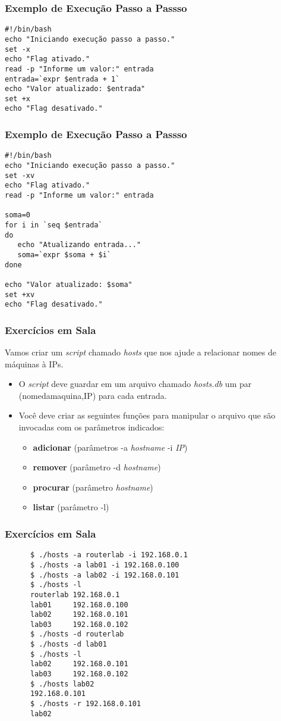 \documentclass{beamer}
\begin{document}
   \begin{frame}[fragile]
      \frametitle{Exemplo de Execução Passo a Passso}
      \begin{verbatim}
#!/bin/bash
echo "Iniciando execução passo a passo."
set -x
echo "Flag ativado."
read -p "Informe um valor:" entrada
entrada=`expr $entrada + 1`
echo "Valor atualizado: $entrada"
set +x
echo "Flag desativado."
      \end{verbatim}
\end{frame}

   \begin{frame}[fragile]
      \frametitle{Exemplo de Execução Passo a Passso}
      \begin{verbatim}
#!/bin/bash
echo "Iniciando execução passo a passo."
set -xv
echo "Flag ativado."
read -p "Informe um valor:" entrada

soma=0
for i in `seq $entrada`
do
   echo "Atualizando entrada..."
   soma=`expr $soma + $i`
done

echo "Valor atualizado: $soma"
set +xv
echo "Flag desativado."
      \end{verbatim}
\end{frame}


   \begin{frame}
      \frametitle{Exercícios em Sala}
      Vamos criar um \textit{script} chamado \textit{hosts} que nos ajude a relacionar nomes de máquinas à IPs.
      \begin{itemize}
         \item O \textit{script} deve guardar em um arquivo chamado \textit{hosts.db} um par (nomedamaquina,IP) para cada entrada.
	 \item Você deve criar as seguintes funções para manipular o arquivo que são invocadas com os parâmetros indicados:
         \begin{itemize}
            \item \textbf{adicionar} (parâmetros -a \textit{hostname} -i \textit{IP})
	    \item \textbf{remover} (parâmetro -d \textit{hostname})
	    \item \textbf{procurar} (parâmetro \textit{hostname})
	    \item \textbf{listar} (parâmetro -l)
         \end{itemize}
      \end{itemize}
   \end{frame}

   \begin{frame}[fragile]
      \frametitle{Exercícios em Sala}
      \begin{verbatim}
      $ ./hosts -a routerlab -i 192.168.0.1
      $ ./hosts -a lab01 -i 192.168.0.100
      $ ./hosts -a lab02 -i 192.168.0.101
      $ ./hosts -l
      routerlab 192.168.0.1
      lab01     192.168.0.100
      lab02     192.168.0.101
      lab03     192.168.0.102
      $ ./hosts -d routerlab
      $ ./hosts -d lab01
      $ ./hosts -l 
      lab02     192.168.0.101
      lab03     192.168.0.102
      $ ./hosts lab02
      192.168.0.101
      $ ./hosts -r 192.168.0.101
      lab02
      \end{verbatim}
\end{frame}
\end{document}
